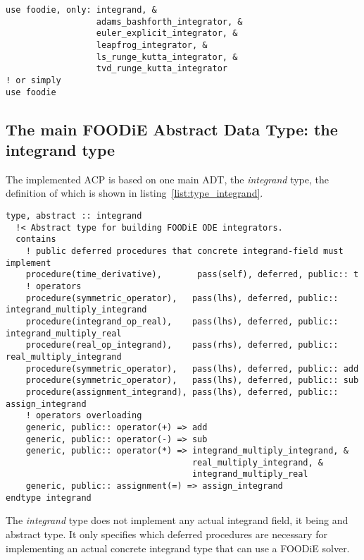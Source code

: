 \documentclass[pdftex,preprint,3p,times,numbers]{elsarticle}
\begin{document}
\begin{lstlisting}[firstnumber=1,style=code,caption={usage example importing all public entities of FOODiE main module},label={list:main_module}]
use foodie, only: integrand, &
                  adams_bashforth_integrator, &
                  euler_explicit_integrator, &
                  leapfrog_integrator, &
                  ls_runge_kutta_integrator, &
                  tvd_runge_kutta_integrator
! or simply
use foodie
\end{lstlisting}

\subsection{The main FOODiE Abstract Data Type: the integrand type}\label{subsec:type_integrand}

The implemented ACP is based on one main ADT, the \emph{integrand} type, the definition of which is shown in listing~\ref{list:type_integrand}.

\begin{lstlisting}[firstnumber=1,style=code,caption={integrand type definition},label={list:type_integrand}]
type, abstract :: integrand
  !< Abstract type for building FOODiE ODE integrators.
  contains
    ! public deferred procedures that concrete integrand-field must implement
    procedure(time_derivative),       pass(self), deferred, public:: t
    ! operators
    procedure(symmetric_operator),   pass(lhs), deferred, public:: integrand_multiply_integrand
    procedure(integrand_op_real),    pass(lhs), deferred, public:: integrand_multiply_real
    procedure(real_op_integrand),    pass(rhs), deferred, public:: real_multiply_integrand
    procedure(symmetric_operator),   pass(lhs), deferred, public:: add
    procedure(symmetric_operator),   pass(lhs), deferred, public:: sub
    procedure(assignment_integrand), pass(lhs), deferred, public:: assign_integrand
    ! operators overloading
    generic, public:: operator(+) => add
    generic, public:: operator(-) => sub
    generic, public:: operator(*) => integrand_multiply_integrand, &
                                     real_multiply_integrand, &
                                     integrand_multiply_real
    generic, public:: assignment(=) => assign_integrand
endtype integrand
\end{lstlisting}

The \emph{integrand} type does not implement any actual integrand field, it being and abstract type. It only specifies which deferred procedures are necessary for implementing an actual concrete integrand type that can use a FOODiE solver.
\end{document}
